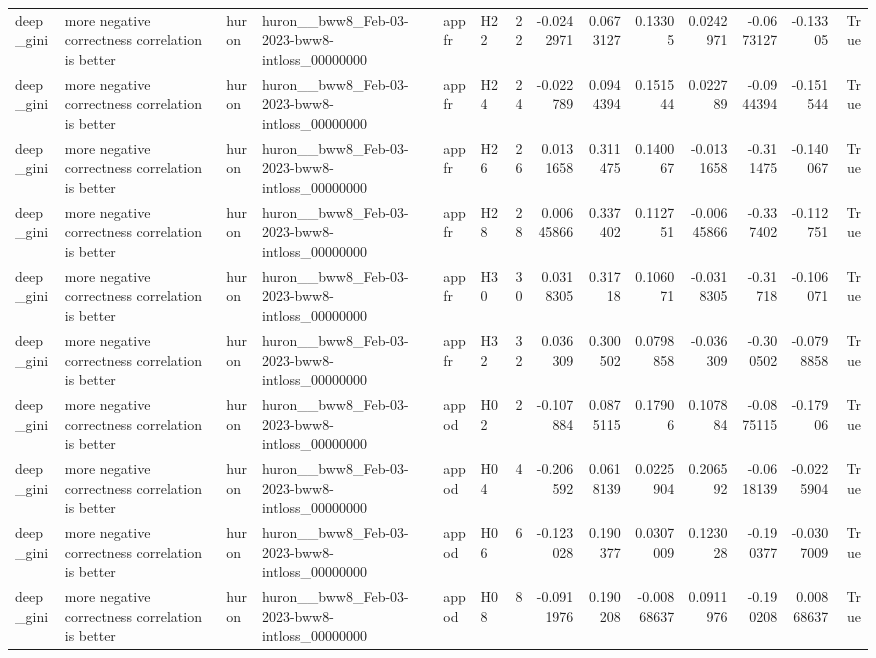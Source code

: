 \begin{longtable}{llllllrrrrrrrr}
deep\_gini & more negative correctness correlation is better & huron & huron\_\_bww8\_Feb-03-2023-bww8-intloss\_00000000 & appfr & H22 & 22 & -0.0242971 & 0.0673127 & 0.13305 & 0.0242971 & -0.0673127 & -0.13305 & True \\
deep\_gini & more negative correctness correlation is better & huron & huron\_\_bww8\_Feb-03-2023-bww8-intloss\_00000000 & appfr & H24 & 24 & -0.022789 & 0.0944394 & 0.151544 & 0.022789 & -0.0944394 & -0.151544 & True \\
deep\_gini & more negative correctness correlation is better & huron & huron\_\_bww8\_Feb-03-2023-bww8-intloss\_00000000 & appfr & H26 & 26 & 0.0131658 & 0.311475 & 0.140067 & -0.0131658 & -0.311475 & -0.140067 & True \\
deep\_gini & more negative correctness correlation is better & huron & huron\_\_bww8\_Feb-03-2023-bww8-intloss\_00000000 & appfr & H28 & 28 & 0.00645866 & 0.337402 & 0.112751 & -0.00645866 & -0.337402 & -0.112751 & True \\
deep\_gini & more negative correctness correlation is better & huron & huron\_\_bww8\_Feb-03-2023-bww8-intloss\_00000000 & appfr & H30 & 30 & 0.0318305 & 0.31718 & 0.106071 & -0.0318305 & -0.31718 & -0.106071 & True \\
deep\_gini & more negative correctness correlation is better & huron & huron\_\_bww8\_Feb-03-2023-bww8-intloss\_00000000 & appfr & H32 & 32 & 0.036309 & 0.300502 & 0.0798858 & -0.036309 & -0.300502 & -0.0798858 & True \\
deep\_gini & more negative correctness correlation is better & huron & huron\_\_bww8\_Feb-03-2023-bww8-intloss\_00000000 & appod & H02 & 2 & -0.107884 & 0.0875115 & 0.17906 & 0.107884 & -0.0875115 & -0.17906 & True \\
deep\_gini & more negative correctness correlation is better & huron & huron\_\_bww8\_Feb-03-2023-bww8-intloss\_00000000 & appod & H04 & 4 & -0.206592 & 0.0618139 & 0.0225904 & 0.206592 & -0.0618139 & -0.0225904 & True \\
deep\_gini & more negative correctness correlation is better & huron & huron\_\_bww8\_Feb-03-2023-bww8-intloss\_00000000 & appod & H06 & 6 & -0.123028 & 0.190377 & 0.0307009 & 0.123028 & -0.190377 & -0.0307009 & True \\
deep\_gini & more negative correctness correlation is better & huron & huron\_\_bww8\_Feb-03-2023-bww8-intloss\_00000000 & appod & H08 & 8 & -0.0911976 & 0.190208 & -0.00868637 & 0.0911976 & -0.190208 & 0.00868637 & True \\

\end{longtable}
